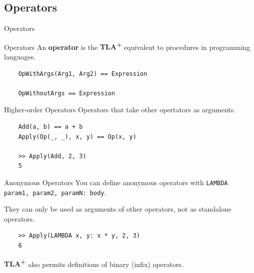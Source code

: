 \documentclass[10pt]{beamer}
\newcommand{\tlaplus}{\textbf{\textsc{TLA\textsuperscript{+}}}\xspace}
\begin{document}
\subsection{Operators}


\begin{frame}{Operators}
  
  \begin{exampleblock}{Operators}
    An \textbf{operator} is the \tlaplus equivalent to procedures in programming languages.
  \end{exampleblock}

  \begin{verbatim}
    OpWithArgs(Arg1, Arg2) == Expression

    OpWithoutArgs == Expression
  \end{verbatim}

  \framebreak

  \begin{exampleblock}{Higher-order Operators}
    Operators that take other opertators as arguments.
  \end{exampleblock}

  \begin{verbatim}
    Add(a, b) == a + b
    Apply(Op(_, _), x, y) == Op(x, y)

    >> Apply(Add, 2, 3)
    5
  \end{verbatim}

  \framebreak

  \begin{exampleblock}{Anonymous Operators}
    You can define anonymous operators with \texttt{LAMBDA param1, param2, paramN: body}.

    They can only be used as arguments of other operators, not as standalone operators.
  \end{exampleblock}

  \begin{verbatim}
    >> Apply(LAMBDA x, y: x * y, 2, 3)
    6
  \end{verbatim}
  
  \framebreak

  \tlaplus also permits definitions of binary (infix) operators.


\end{frame}
\end{document}
